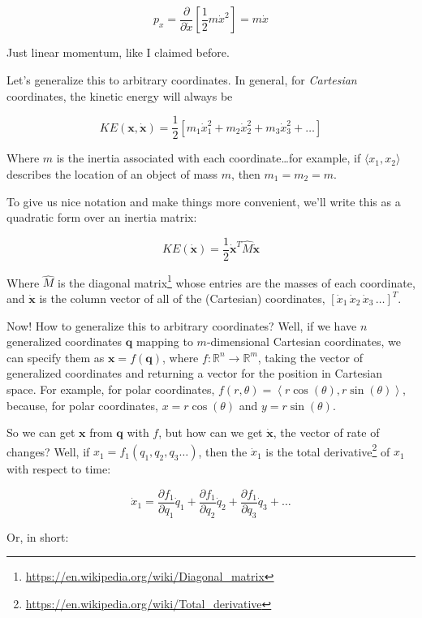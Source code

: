 \documentclass[]{article}
\renewcommand{\href}[2]{#2\footnote{\url{#1}}}
\begin{document}
\[
p_x = \frac{\partial}{\partial \dot{x}} \left[ \frac{1}{2} m \dot{x}^2 \right] = m \dot{x}
\]

Just linear momentum, like I claimed before.

Let's generalize this to arbitrary coordinates. In general, for \emph{Cartesian}
coordinates, the kinetic energy will always be

\[
KE(\mathbf{x}, \dot{\mathbf{x}}) = \frac{1}{2} \left[ m_1 \dot{x}_1^2 + m_2 \dot{x}_2^2 + m_3 \dot{x}_3^2 + \dots \right]
\]

Where \(m\) is the inertia associated with each coordinate\ldots for example, if
\(\langle x_1, x_2 \rangle\) describes the location of an object of mass \(m\),
then \(m_1 = m_2 = m\).

To give us nice notation and make things more convenient, we'll write this as a
quadratic form over an inertia matrix:

\[
KE(\dot{\mathbf{x}}) = \frac{1}{2} \dot{\mathbf{x}}^T \hat{M} \dot{\mathbf{x}}
\]

Where \(\hat{M}\) is the
\href{https://en.wikipedia.org/wiki/Diagonal_matrix}{diagonal matrix} whose
entries are the masses of each coordinate, and \(\dot{\mathbf{x}}\) is the
column vector of all of the (Cartesian) coordinates,
\(\left[ \dot{x}_1\, \dot{x}_2\, \dot{x}_3\, \dots \right]^T\).

Now! How to generalize this to arbitrary coordinates? Well, if we have \(n\)
generalized coordinates \(\mathbf{q}\) mapping to \(m\)-dimensional Cartesian
coordinates, we can specify them as \(\mathbf{x} = f(\mathbf{q})\), where
\(f : \mathbb{R}^n \rightarrow \mathbb{R}^m\), taking the vector of generalized
coordinates and returning a vector for the position in Cartesian space. For
example, for polar coordinates,
\(f(r, \theta) = \left \langle r \cos(\theta), r \sin(\theta) \right \rangle\),
because, for polar coordinates, \(x = r \cos(\theta)\) and
\(y = r \sin(\theta)\).

So we can get \(\mathbf{x}\) from \(\mathbf{q}\) with \(f\), but how can we get
\(\dot{\mathbf{x}}\), the vector of rate of changes? Well, if
\(x_1 = f_1(q_1, q_2, q_3 \dots)\), then the \(\dot{x}_1\) is the
\href{https://en.wikipedia.org/wiki/Total_derivative}{total derivative} of
\(x_1\) with respect to time:

\[
\dot{x}_1 = \frac{\partial f_1}{\partial q_1} \dot{q}_1 +
    \frac{\partial f_1}{\partial q_2} \dot{q}_2 +
    \frac{\partial f_1}{\partial q_3} \dot{q}_3 + \dots
\]

Or, in short:
\end{document}
